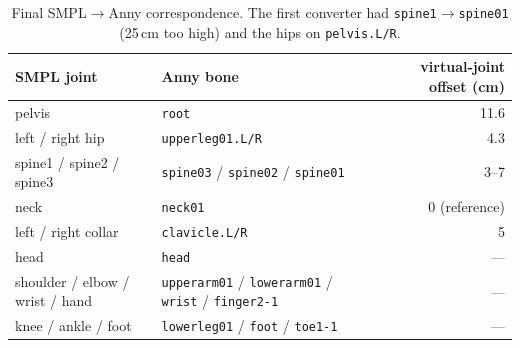 
\begin{table}[h]
\centering\small
\begin{tabular}{llr}
\toprule
SMPL joint & Anny bone & virtual-joint offset (cm) \\
\midrule
pelvis & \texttt{root} & 11.6 \\
left / right hip & \texttt{upperleg01.L/R} & 4.3 \\
spine1 / spine2 / spine3 & \texttt{spine03} / \texttt{spine02} / \texttt{spine01} & 3--7 \\
neck & \texttt{neck01} & 0 (reference) \\
left / right collar & \texttt{clavicle.L/R} & 5 \\
head & \texttt{head} & --- \\
shoulder / elbow / wrist / hand & \texttt{upperarm01} / \texttt{lowerarm01} / \texttt{wrist} / \texttt{finger2-1} & --- \\
knee / ankle / foot & \texttt{lowerleg01} / \texttt{foot} / \texttt{toe1-1} & --- \\
\bottomrule
\end{tabular}
\caption{Final SMPL$\rightarrow$Anny correspondence. The first converter had
\texttt{spine1}$\rightarrow$\texttt{spine01} (25\,cm too high) and the hips on
\texttt{pelvis.L/R}.}
\label{tab:mapping}
\end{table}
